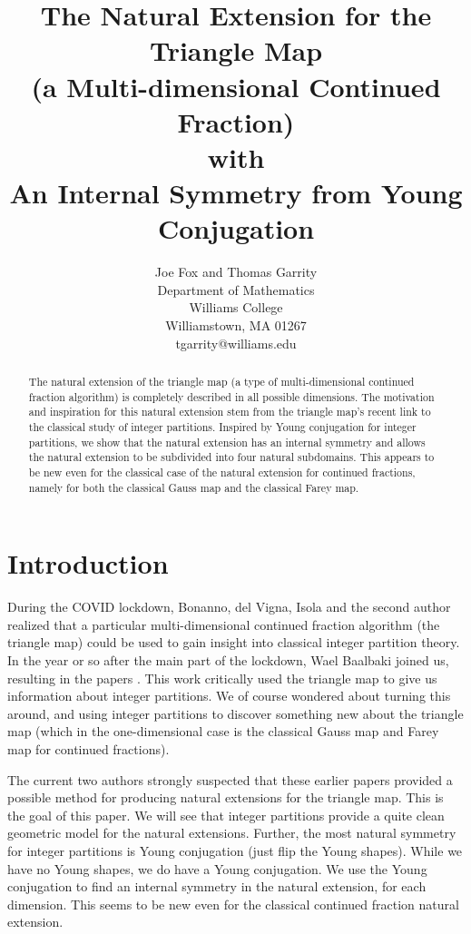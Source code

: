 \documentclass[12pt,oneside,openany]{article}
\title{The Natural Extension for the Triangle Map\\ (a Multi-dimensional Continued Fraction)\\ with \\ An Internal Symmetry from Young Conjugation}
\author{Joe Fox and Thomas Garrity\\
Department of Mathematics\\
Williams College\\
Williamstown, MA 01267\\
tgarrity@williams.edu}
\begin{document}
\maketitle

 

\begin{abstract} The natural extension of the triangle map  (a type of multi-dimensional continued fraction algorithm) is completely described  in all possible dimensions.  The motivation and inspiration for this natural extension stem from  the triangle map's recent link to the classical study of integer partitions.   Inspired by Young conjugation for integer partitions, we show that the natural extension has an internal symmetry and allows the natural extension to be subdivided into four natural subdomains.  This appears to be new even for the classical case of the natural extension for continued fractions, namely for both the classical Gauss map and the classical  Farey map.


 \end{abstract}

\section{Introduction}

During the COVID lockdown, Bonanno, del Vigna, Isola and the second author realized that  a particular multi-dimensional continued fraction algorithm (the triangle map) could be used to gain insight into classical integer partition theory.  In the year or so after the main part of the lockdown, Wael Baalbaki joined us, resulting in the papers \cite{BBDGI, BG}.  This work critically used the triangle map to give us information about integer partitions.  We of course wondered about turning this around, and using integer partitions to discover something new about the triangle map (which in the one-dimensional case is the classical Gauss map and Farey map for continued fractions).

The current two authors  strongly suspected that these earlier papers  provided a possible method for producing natural extensions for the triangle map.  This is the goal of this paper.  We will see that integer partitions provide a quite clean geometric model for the natural extensions.  Further, the most natural symmetry for integer partitions is Young conjugation (just flip the Young shapes).  While we have no Young shapes, we do have a Young conjugation. We use the Young conjugation to find an internal symmetry in the natural extension, for each dimension.  This seems to be new even for the classical continued fraction natural extension. 
\end{document}
